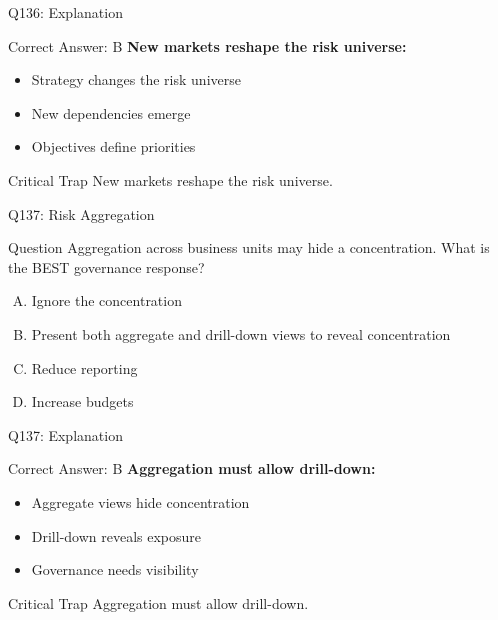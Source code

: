 \documentclass{beamer}
\begin{document}
	\begin{frame}{Q136: Explanation}
		\begin{block}{Correct Answer: B}
			\textbf{New markets reshape the risk universe:}
			\begin{itemize}
				\item Strategy changes the risk universe
				\item New dependencies emerge
				\item Objectives define priorities
			\end{itemize}
		\end{block}
		\begin{alertblock}{Critical Trap}
			New markets reshape the risk universe.
		\end{alertblock}
	\end{frame}
	
	\begin{frame}{Q137: Risk Aggregation}
		\begin{block}{Question}
			Aggregation across business units may hide a concentration. What is the BEST governance response?
		\end{block}
		\begin{enumerate}[(A)]
			\item Ignore the concentration
			\item Present both aggregate and drill-down views to reveal concentration
			\item Reduce reporting
			\item Increase budgets
		\end{enumerate}
	\end{frame}
	
	\begin{frame}{Q137: Explanation}
		\begin{block}{Correct Answer: B}
			\textbf{Aggregation must allow drill-down:}
			\begin{itemize}
				\item Aggregate views hide concentration
				\item Drill-down reveals exposure
				\item Governance needs visibility
			\end{itemize}
		\end{block}
		\begin{alertblock}{Critical Trap}
			Aggregation must allow drill-down.
		\end{alertblock}
	\end{frame}
	
\end{document}
